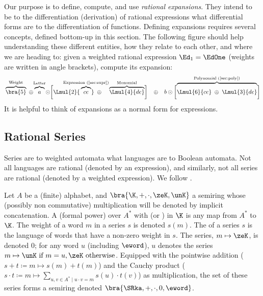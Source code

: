 \documentclass[a4paper,USenglish]{lipics}
\begin{document}
Our purpose is to define, compute, and use \emph{rational expansions}.  They
intend to be to the differentiation (derivation) of rational expressions
what differential forms are to the differentiation of functions.  Defining
expansions requires several concepts, defined bottom-up in this section.
The following figure should help understanding these different entities, how
they relate to each other, and where we are heading to: given a weighted
rational expression $\Ed_1 = \EdOne$ (weights are written in angle
brackets), compute its expansion:
\vspace{-.8\baselineskip}
\begin{align*}
\UB{Expansion (\cref{sec:expa})}
{
  \PUB{Constant term}
  {
    \vphantom{\PUB{Dummy}{\POB{Weight}{\biggl[bra{2}\biggr]}}}
    \POB{Weight}{\bra{5}}
  }
  \;
  \oplus
  \PUB{Proper part of the expansion}
  {
    \UB{First}{
      \vphantom{\biggl[\biggr]}\POB{Letter}{a}
    }
    \odot
    \biggl[
      \Lmul{2}{\UB{Derived term}{\vphantom{\biggl[\biggr]}\POB{Expression (\cref{sec:expr})}{ce}}}
      \;\oplus\;\;\;\;
      \POB{Monomial}{
        \Lmul{4}{de}
        }
    \biggr]
    \;\;\;\oplus\;\;\;
    b \odot
    \biggl[
      \OB{Polynomial (\cref{sec:poly})}
      {
        \Lmul{6}{\vphantom{\biggl[\biggr]}ce}
        \;\oplus\;
        \Lmul{3}{de}
      }
    \biggr]
  }
}
\end{align*}
It is helpful to think of expansions as a normal form for expressions.

\subsection{Rational Series}

Series are to weighted automata what languages are to Boolean automata.  Not
all languages are rational (denoted by an expression), and similarly, not
all series are rational (denoted by a weighted expression).  We follow
\citet{sakarovitch.09.eat}.

Let $A$ be a (finite) alphabet, and $\bra{\K, +, \cdot, \zeK, \unK}$ a
semiring whose (possibly non commutative) multiplication will be denoted by
implicit concatenation.  A (formal power)  over $A^*$ with
 (or ) in $\K$ is any map from $A^*$ to
$\K$.  The weight of a word $m$ in a series $s$ is denoted $s(m)$.  The
 of a series $s$ is the language of words that have a non-zero
weight in $s$.  The  series, $m \mapsto \zeK$, is denoted $0$;
for any word $u$ (including $\eword$), $u$ denotes the series
$m \mapsto \unK \text{ if $m = u$}, \zeK \text{ otherwise}$.  Equipped with
the pointwise addition ($s + t \coloneqq m \mapsto s(m) + t(m)$) and the
Cauchy product
($s \cdot t \coloneqq m \mapsto \sum_{u, v\in A^* \mid u \cdot v = m} s(u)
\cdot t(v)$)
as multiplication, the set of these series forms a semiring denoted
$\bra{\SRka, +, \cdot, 0, \eword}$.
\end{document}
